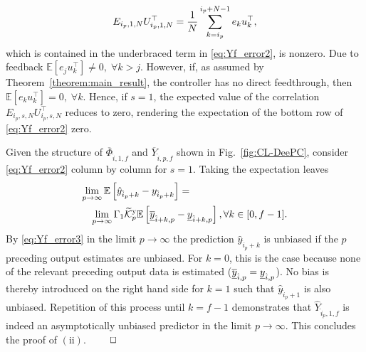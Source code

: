 \begin{align}
E_{i_p,1,N}U_{i_p,1,N}^\top =
    \frac{1}{N}\sum\limits_{k=i_p}^{i_p+N-1}e_{k} u_{k}^\top,\notag
\end{align}
which is contained in the underbraced term in \eqref{eq:Yf_error2}, is nonzero. Due to feedback $\mathbb{E}[e_j u_k^\top]\neq 0,\;\forall k>j$. However, if, as assumed by Theorem~\ref{theorem:main_result}, the controller has no direct feedthrough, then $\mathbb{E}[e_k u_k^\top]= 0,\;\forall k$. %
Hence, if ${s=1}$, the expected value of the correlation $E_{i_p,s,N}U_{i_p,s,N}^\top$ reduces to zero, rendering the expectation of the bottom row of \eqref{eq:Yf_error2} zero.

Given the structure of $\overline{\Phi}_{\hat{i},1,f}$ and $\overline{Y}_{\hat{i},p,f}$ shown in Fig.~\ref{fig:CL-DeePC}, consider \eqref{eq:Yf_error2} column by column for $s=1$. Taking the expectation leaves
\begin{align}\label{eq:Yf_error3}
\begin{split}
    &\mkern-3mu\lim_{p\rightarrow\infty} \mathbb{E}\left[\hat{y}_{\hat{i}_p+k}-y_{\hat{i}_p+k}\right] = \\ &\;\;\;\lim_{p\rightarrow\infty}\Gamma_1\widetilde{\mathcal{K}}_{p}^{\mathrm{{y}}}\mathbb{E}\left[\underline{\overline{y}}_{\hat{i}+k,p}-\underline{y}_{\hat{i}+k,p}\right],\forall k\in[0,f-1].
\end{split}
\end{align}
By \eqref{eq:Yf_error3} in the limit $p\rightarrow\infty$ the prediction $\hat{y}_{\hat{i}_p+k}$ is unbiased if the $p$ preceding output estimates are unbiased. For $k=0$, this is the case because none of the relevant preceding output data is estimated ($\underline{\overline{y}}_{\hat{i},p}=\underline{y}_{\hat{i},p}$). No bias is thereby introduced on the right hand side for $k=1$ such that $\hat{y}_{\hat{i}_p+1}$ is also unbiased. Repetition of this process until $k=f-1$ demonstrates that $\widehat{Y}_{\hat{i}_p,1,f}$ is indeed an asymptotically unbiased predictor in the limit $p\rightarrow\infty$. This concludes the proof of $\mathrm{(ii)}$. $\hfill\qed$

